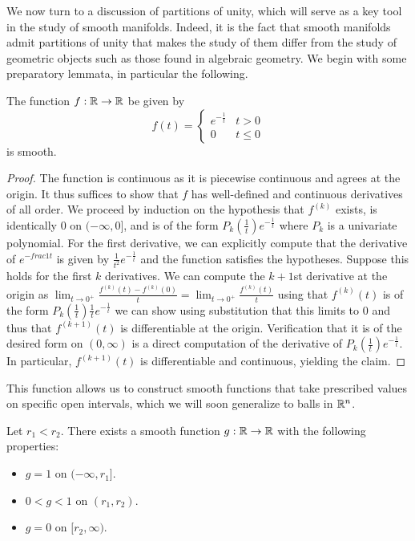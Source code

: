 We now turn to a discussion of partitions of unity, which will serve as a key tool in the study of smooth manifolds. Indeed, it is the fact that smooth manifolds admit partitions of unity that makes the study of them differ from the study of geometric objects such as those found in algebraic geometry. We begin with some preparatory lemmata, in particular the following. 
\begin{lemma}\label{lem: property of special function}
    The function $f:\mathbb{R}\to\mathbb{R}$ be given by 
    $$f(t)=\begin{cases}
        e^{-\frac{1}{t}} & t>0 \\ 0 & t\leq 0
    \end{cases}$$
    is smooth. 
\end{lemma}
\begin{proof}
    The function is continuous as it is piecewise continuous and agrees at the origin. It thus suffices to show that $f$ has well-defined and continuous derivatives of all order. We proceed by induction on the hypothesis that $f^{(k)}$ exists, is identically 0 on $(-\infty,0]$, and is of the form $P_{k}(\frac{1}{t})e^{-\frac{1}{t}}$ where $P_{k}$ is a univariate polynomial. For the first derivative, we can explicitly compute that the derivative of $e^{-frac{1}{t}}$ is given by $\frac{1}{t^{2}}e^{-\frac{1}{t}}$ and the function satisfies the hypotheses. Suppose this holds for the first $k$ derivatives. We can compute the $k+1$st derivative at the origin as $\lim_{t\to 0^{+}}\frac{f^{(k)}(t)-f^{(k)}(0)}{t}=\lim_{t\to 0^{+}}\frac{f^{(k)}(t)}{t}$ using that $f^{(k)}(t)$ is of the form $P_{k}(\frac{1}{t})\frac{1}{t}e^{-\frac{1}{t}}$ we can show using substitution that this limits to 0 and thus that $f^{(k+1)}(t)$ is differentiable at the origin. Verification that it is of the desired form on $(0,\infty)$ is a direct computation of the derivative of $P_{k}(\frac{1}{t})e^{-\frac{1}{t}}$. In particular, $f^{(k+1)}(t)$ is differentiable and continuous, yielding the claim. 
\end{proof}
This function allows us to construct smooth functions that take prescribed values on specific open intervals, which we will soon generalize to balls in $\mathbb{R}^{n}$. 
\begin{lemma}\label{lem: 1 dimensional cutoff functions}
    Let $r_{1}<r_{2}$. There exists a smooth function $g:\mathbb{R}\to\mathbb{R}$ with the following properties:
    \begin{itemize}
        \item $g=1$ on $(-\infty,r_{1}]$. 
        \item $0<g<1$ on $(r_{1},r_{2})$. 
        \item $g=0$ on $[r_{2},\infty)$. 
    \end{itemize}
\end{lemma}
